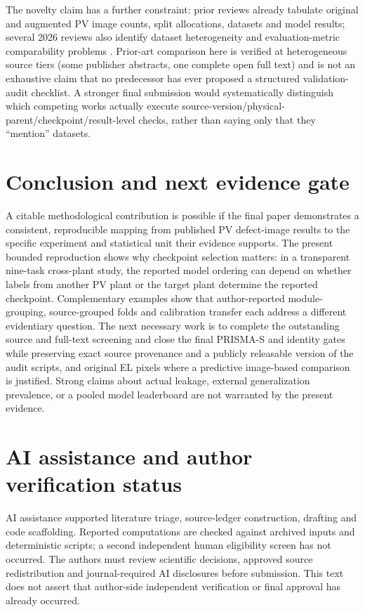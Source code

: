 \documentclass[10pt,a4paper]{article}
\begin{document}
The novelty claim has a further constraint: prior reviews already tabulate original and augmented PV image counts, split allocations, datasets and model results; several 2026 reviews also identify dataset heterogeneity and evaluation-metric comparability problems \cite{ali2026,meena2026,ieee2026,rahman2026,pillai2027}. Prior-art comparison here is verified at heterogeneous source tiers (some publisher abstracts, one complete open full text) and is not an exhaustive claim that no predecessor has ever proposed a structured validation-audit checklist. A stronger final submission would systematically distinguish which competing works actually execute source-version/physical-parent/checkpoint/result-level checks, rather than saying only that they ``mention'' datasets.

\section{Conclusion and next evidence gate}
A citable methodological contribution is possible if the final paper demonstrates a consistent, reproducible mapping from published PV defect-image results to the specific experiment and statistical unit their evidence supports. The present bounded reproduction shows why checkpoint selection matters: in a transparent nine-task cross-plant study, the reported model ordering can depend on whether labels from another PV plant or the target plant determine the reported checkpoint. Complementary examples show that author-reported module-grouping, source-grouped folds and calibration transfer each address a different evidentiary question. The next necessary work is to complete the outstanding source and full-text screening and close the final PRISMA-S and identity gates while preserving exact source provenance and a publicly releasable version of the audit scripts, and original EL pixels where a predictive image-based comparison is justified. Strong claims about actual leakage, external generalization prevalence, or a pooled model leaderboard are not warranted by the present evidence.

\section*{AI assistance and author verification status}
AI assistance supported literature triage, source-ledger construction, drafting and code scaffolding. Reported computations are checked against archived inputs and deterministic scripts; a second independent human eligibility screen has not occurred. The authors must review scientific decisions, approved source redistribution and journal-required AI disclosures before submission. This text does not assert that author-side independent verification or final approval has already occurred.
\end{document}
